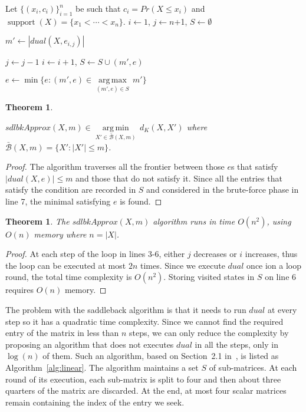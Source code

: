 \documentclass[letterpaper]{article} %
\newtheorem{theorem}[thm]{Theorem}
\DeclareMathOperator{\supp}{support}
\begin{document}
\begin{algorithm}
	\DontPrintSemicolon
	Let $\{(x_i, c_i)\}_{i=1}^n$ be such that $c_i=Pr(X \leq x_i)$ and $\supp(X)=\{x_1 < \cdots < x_n\}$.\;
    $i \gets 1$, $j \gets n$+1, $S \gets \emptyset$\;

	{	
		$m' \gets |dual(X,e_{i,j})|$\;
	
		{
			$j \gets j - 1$
		}
		 {
			$i \gets i + 1$, $S \gets S \cup (m',e)$			
		}
	}
	$e \gets \min\{e\colon (m',e) \in \underset{(m',e)\in S}{\operatorname{arg\,max}}\, m'\}$\;
	
	\caption{$sdlbkApprox(X,m)$}   
	\label{alg:saddleback}
\end{algorithm}


\begin{theorem}\label{the:correctnessSaddleback}
	   
    $sdlbkApprox(X,m) {\in} \underset{X' \in \bar{\mathcal{B}}(X,m) }{\operatorname{arg\,min}}\, d_K(X,X')$ where $\bar{\mathcal{B}}(X,m)=\{X'\colon |X'| \leq m\}$.
\end{theorem}
\begin{proof}
The algorithm traverses all the frontier between those $e$s that satisfy $|dual(X,e)| \leq m$ and those that do not satisfy it. Since all the entries that satisfy the condition are recorded in $S$ and considered in the brute-force phase in line 7, the minimal satisfying $e$ is found.
\end{proof}

\begin{theorem}\label{the:complexitySaddleback}
	The $sdlbkApprox(X,m)$ algorithm runs in time $O(n^2)$, using $O(n)$ memory where $n=|X|$.
\end{theorem}
\begin{proof}
	At each step of the loop in lines 3-6, either $j$ decreases or $i$ increases, thus the loop can be executed at most $2n$ times. Since we execute $dual$ once ion a loop round, the total time complexity is $O(n^2)$. Storing visited states in $S$ on line 6 requires  $O(n)$ memory.
\end{proof}

The problem with the saddleback algorithm is that it needs to run $dual$ at every step so it has a quadratic time complexity. Since we cannot find the required entry of the matrix in less than $n$ steps, we can only reduce the complexity by proposing an algorithm that does not executes $dual$ in all the steps, only in $\log(n)$ of them. Such an algorithm, based on Section~2.1 in~\cite{Fournier2011}, is listed as Algorithm~\ref{alg:linear}. The algorithm maintains a set $S$ of sub-matrices. At each round of its execution, each sub-matrix is split to four and then about three quarters of the matrix are discarded. At the end, at most four scalar matrices remain containing the index of the entry we seek.
\end{document}
